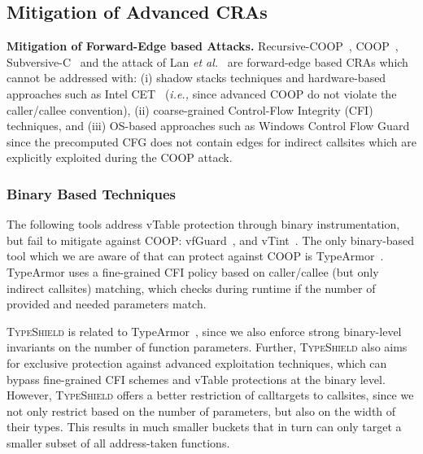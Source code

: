 \subsection{Mitigation of Advanced CRAs}
\textbf{Mitigation of Forward-Edge based Attacks.}
\label{Mitigation of Advanced Code-Reuse Attacks}
Recursive-COOP~\cite{crane:readactor++}, COOP~\cite{schuster:coop}, Subversive-C~\cite{subversive-c:lettner} and the attack of Lan \textit{et al.}~\cite{loop:oriented} are 
forward-edge based CRAs which cannot be addressed with:
(i)  shadow stacks techniques and hardware-based approaches such as Intel CET~\cite{intel:cet} (\textit{i.e.,} since advanced COOP do not violate 
the caller/callee convention), 
(ii) coarse-grained Control-Flow Integrity (CFI)~\cite{abadi:cfi2, abadi:cfi} techniques, and 
(iii) OS-based approaches such as Windows Control Flow Guard~\cite{windows:cfguard} 
since the precomputed CFG does not contain edges for indirect callsites which are explicitly exploited during the COOP attack.

\subsubsection{Binary Based Techniques}
The following tools address vTable protection through binary instrumentation, 
but fail to mitigate against COOP: vfGuard~\cite{vfuard:aravind}, and vTint~\cite{vtint:zhang}. 
The only binary-based tool which we are aware of that can protect against COOP is TypeArmor~\cite{veen:typearmor}. 
TypeArmor uses a fine-grained CFI policy based on caller/callee (but only indirect callsites) matching, which checks 
during runtime if the number of provided and needed parameters match.

\textsc{TypeShield} is related to TypeArmor~\cite{veen:typearmor}, since we also enforce strong binary-level 
invariants on the number of function parameters. Further, \textsc{TypeShield} also aims for exclusive protection 
against advanced exploitation techniques, which can bypass fine-grained CFI schemes and vTable protections at the 
binary level. However, \textsc{TypeShield} offers a better restriction of calltargets to callsites, since we not 
only restrict based on the number of parameters, but also on the width of their types. This results in much smaller 
buckets that in turn can only target a smaller subset of all address-taken functions. 


